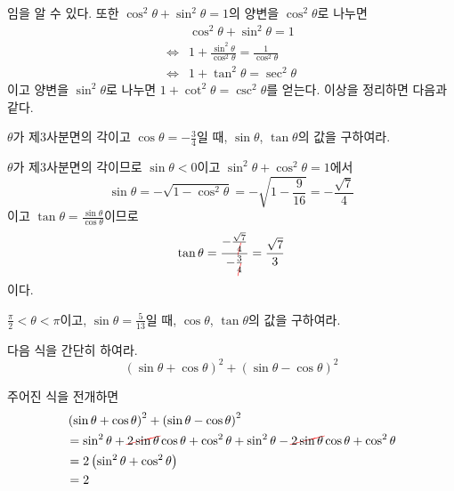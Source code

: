 \documentclass[11pt, a4paper]{book}
\begin{document}
임을 알 수 있다. 또한 $\cos^2\theta + \sin^2\theta =1$의 양변을 $\cos^{2}\theta$로 나누면
\begin{align*}
	\phantom{\Leftrightarrow}&\cos^2\theta + \sin^2\theta =1  \\
	\Leftrightarrow & 1 + \frac{\sin^2\theta}{\cos^2\theta} =\frac{1}{\cos^2\theta}\\
	\Leftrightarrow & 1 + \tan^2\theta = \sec^2\theta
\end{align*}
이고 양변을 $\sin^2\theta$로 나누면 $1+\cot^2\theta=\csc^2\theta$를 얻는다.
이상을 정리하면 다음과 같다.
\vspace{1em}
\begin{theorem}
\end{theorem}
\vspace{1em}
\begin{example}
	$\theta$가 제3사분면의 각이고 $\cos\theta =-\frac{3}{4}$일 때, $\sin\theta$, $\tan\theta$의 값을 구하여라.
	\begin{solution}
		$\theta$가 제3사분면의 각이므로 $\sin\theta<0$이고 $\sin^2 \theta + \cos^2\theta=1$에서
		\[
		\sin\theta = -\sqrt{1-\cos^2\theta} = -\sqrt{1-\frac{9}{16}} = -\frac{\sqrt{7}}{4}
		\]
		이고 $\tan\theta = \frac{\sin\theta}{\cos\theta}$이므로
		\[
		\tan\theta = \frac{-\frac{\sqrt{7}}{\Ccancel[red]{4}}}{-\frac{3}{\Ccancel[red]{4}}} =\frac{\sqrt{7}}{3}
		\]
		이다.
	\end{solution}
\end{example}

\begin{problem}
	$\frac{\pi}{2}<\theta < \pi$이고, $\sin\theta =\frac{5}{13}$일 때, $\cos\theta$, $\tan\theta$의 값을 구하여라.
\end{problem}
\vspace{1em}
\begin{example}
	다음 식을 간단히 하여라.
	\[
	\left(\sin\theta + \cos\theta\right)^2 + \left(\sin\theta -\cos\theta\right)^2
	\]
	\begin{solution}
		주어진 식을 전개하면
		\begin{align*}
			&\left(\sin\theta + \cos\theta\right)^2 + \left(\sin\theta -\cos\theta\right)^2\\
			&= \sin^2\theta + \Ccancel[red]{2\sin\theta} \cos\theta + \cos^2\theta + \sin^2\theta - \Ccancel[red]{2\sin\theta }\cos\theta + \cos^2\theta \\
			&=2\left(\sin^2\theta+\cos^2\theta\right) \\
			&=2
		\end{align*}
	\end{solution}
\end{example}
\vspace{1em}
\end{document}
